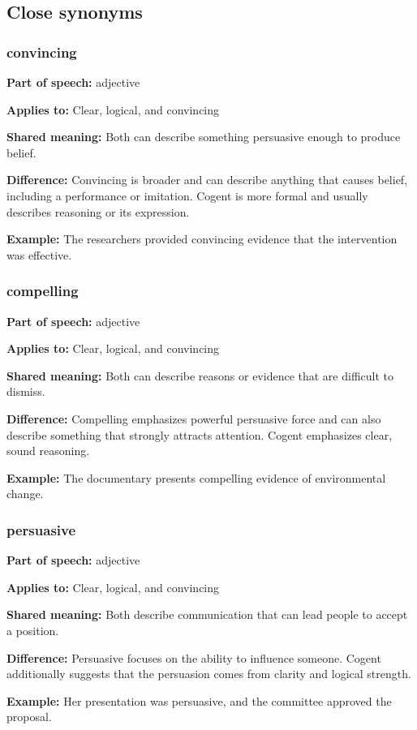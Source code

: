 \documentclass[11pt]{article}
\begin{document}
\subsection{Close synonyms}
\subsubsection{convincing}
\textbf{Part of speech:} adjective

\textbf{Applies to:} Clear, logical, and convincing

\textbf{Shared meaning:} Both can describe something persuasive enough to produce belief.

\textbf{Difference:} Convincing is broader and can describe anything that causes belief, including a performance or imitation. Cogent is more formal and usually describes reasoning or its expression.

\textbf{Example:} The researchers provided convincing evidence that the intervention was effective.

\subsubsection{compelling}
\textbf{Part of speech:} adjective

\textbf{Applies to:} Clear, logical, and convincing

\textbf{Shared meaning:} Both can describe reasons or evidence that are difficult to dismiss.

\textbf{Difference:} Compelling emphasizes powerful persuasive force and can also describe something that strongly attracts attention. Cogent emphasizes clear, sound reasoning.

\textbf{Example:} The documentary presents compelling evidence of environmental change.

\subsubsection{persuasive}
\textbf{Part of speech:} adjective

\textbf{Applies to:} Clear, logical, and convincing

\textbf{Shared meaning:} Both describe communication that can lead people to accept a position.

\textbf{Difference:} Persuasive focuses on the ability to influence someone. Cogent additionally suggests that the persuasion comes from clarity and logical strength.

\textbf{Example:} Her presentation was persuasive, and the committee approved the proposal.
\end{document}
